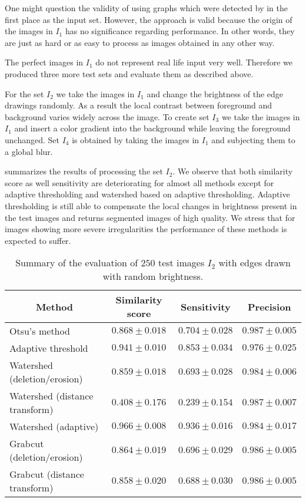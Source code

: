 		One might question the validity of using graphs which were detected by \NEFI in the first place as the input set. However, the approach is valid because the origin of the images in $I_1$ has no significance regarding \NEFIs performance. In other words, they are just as hard or as easy to process as images obtained in any other way. 

		The perfect images in $I_1$ do not represent real life input very well. Therefore we produced three more test sets and evaluate them as described above.

		For the set $I_2$ we take the images in $I_1$ and change the brightness of the edge drawings randomly. As a result the local contrast between foreground and background varies widely across the image. To create set $I_3$ we take the images in $I_1$ and insert a color gradient into the background while leaving the foreground unchanged. Set $I_4$ is obtained by taking the images in $I_1$ and subjecting them to a global blur.

		 summarizes the results of processing the set $I_2$. We observe that both similarity score as well sensitivity are deteriorating for almost all methods except for adaptive thresholding and watershed based on adaptive thresholding. Adaptive thresholding is still able to compensate the local changes in brightness present in the test images and returns segmented images of high quality. We stress that for images showing more severe irregularities the performance of these methods is expected to suffer. 

		\begin{table}
			\centering
			\begin{tabular}{@{} l *3c @{}}
			\toprule
			\multicolumn{1}{c}{Method}    & Similarity score  & Sensitivity  & Precision \\ 
			\midrule
			Otsu's method                   & $0.868 \pm 0.018$ & $0.704 \pm 0.028$ & $0.987 \pm 0.005$ \\
			Adaptive threshold              & $0.941 \pm 0.010$ & $0.853 \pm 0.034$ & $0.976 \pm 0.025$ \\
			Watershed (deletion/erosion)    & $0.859 \pm 0.018$ & $0.693 \pm 0.028$ & $0.984 \pm 0.006$ \\
			Watershed (distance transform)  & $0.408 \pm 0.176$ & $0.239 \pm 0.154$ & $0.987 \pm 0.007$ \\
			Watershed (adaptive)            & $0.966 \pm 0.008$ & $0.936 \pm 0.016$ & $0.984 \pm 0.017$ \\
			Grabcut (deletion/erosion)      & $0.864 \pm 0.019$ & $0.696 \pm 0.029$ & $0.986 \pm 0.005$ \\
			Grabcut (distance transform)    & $0.858 \pm 0.020$ & $0.688 \pm 0.030$ & $0.986 \pm 0.005$ \\
			\bottomrule
			\end{tabular}
			\caption[\NEFIs evaluation: Edges with varying brightness]{Summary of the evaluation of $250$ test images $I_2$ with edges drawn with random brightness.}
			\label{tab:colored_edges}
		\end{table}

